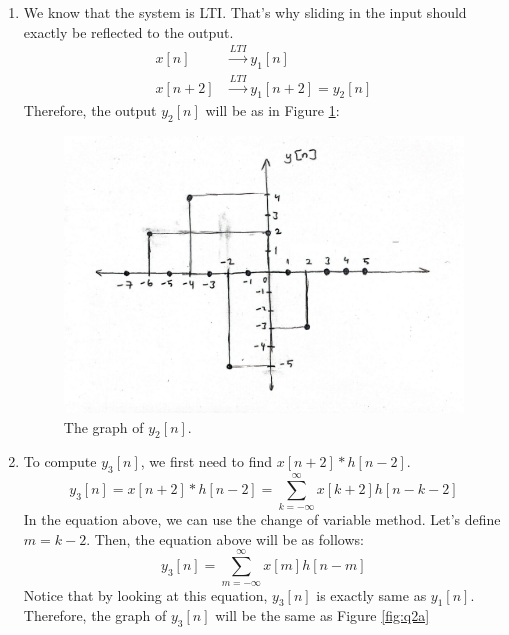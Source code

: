 \documentclass[10pt,a4paper, margin=1in]{article}
\begin{document}
\begin{enumerate}
\begin{enumerate}
    \item %
    We know that the system is LTI. That's why sliding in the input should exactly be reflected to the output.
    \begin{align*}
        x[n] &\xrightarrow{LTI} y_1[n] \\
        x[n+2] &\xrightarrow{LTI} y_1[n+2] = y_2[n]
    \end{align*}
    Therefore, the output $y_2[n]$ will be as in Figure \ref{fig:q2b}:
    \begin{figure}[htbp]
        \centering
            \includegraphics[scale=0.3]{q2b.jpg}
            \caption{The graph of $y_2[n]$.}
            \label{fig:q2b}
    \end{figure}
    
    \item %
    To compute $y_3[n]$, we first need to find $x[n+2]*h[n-2]$.
    $$y_3[n]=x[n+2]*h[n-2]=\sum_{k=-\infty}^{\infty}x[k+2]h[n-k-2]$$
    In the equation above, we can use the change of variable method. Let's define $m=k-2$. Then, the equation above will be as follows:
    $$y_3[n]=\sum_{m=-\infty}^{\infty}x[m]h[n-m]$$
    Notice that by looking at this equation, $y_3[n]$ is exactly same as $y_1[n]$. Therefore, the graph of $y_3[n]$ will be the same as Figure \ref{fig:q2a}
    \end{enumerate}


\end{enumerate}
\end{document}
